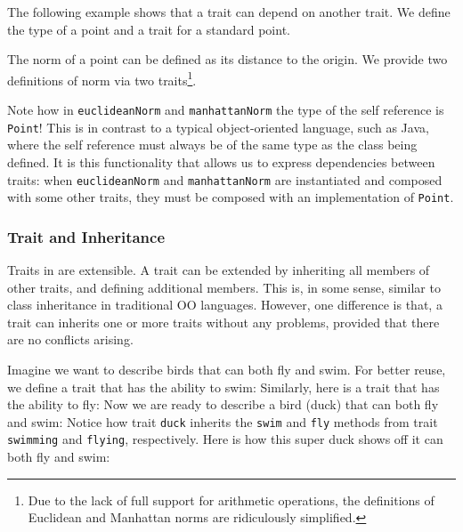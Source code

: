 The following example shows that a trait can depend on another trait. We define
the type of a point and a trait for a standard point.


The norm of a point can be defined as its distance to the origin. We provide two
definitions of norm via two traits\footnote{Due to the lack of full support for
  arithmetic operations, the definitions of Euclidean and Manhattan norms are
  ridiculously simplified. }.


Note how in \lstinline$euclideanNorm$ and \lstinline$manhattanNorm$ the type of
the self reference is \lstinline$Point$! This is in contrast to a typical
object-oriented language, such as Java, where the self reference must always be
of the same type as the class being defined. It is this functionality that
allows us to express dependencies between traits: when \lstinline$euclideanNorm$
and \lstinline$manhattanNorm$ are instantiated and composed with some other
traits, they must be composed with an implementation of \lstinline$Point$.

\subsubsection{Trait and Inheritance}

Traits in \name are extensible. A trait can be extended by inheriting all
members of other traits, and defining additional members. This is, in some
sense, similar to class inheritance in traditional OO languages. However, one
difference is that, a trait can inherits one or more traits without any
problems, provided that there are no conflicts arising.

Imagine we want to describe birds that can both fly and swim. For better reuse,
we define a trait that has the ability to swim:
Similarly, here is a trait that has the ability to fly:
Now we are ready to describe a bird (duck) that can both fly and swim:
Notice how trait \lstinline{duck} inherits the \lstinline{swim} and
\lstinline{fly} methods from trait \lstinline{swimming} and \lstinline{flying},
respectively. Here is how this super duck shows off it can both fly and swim:



